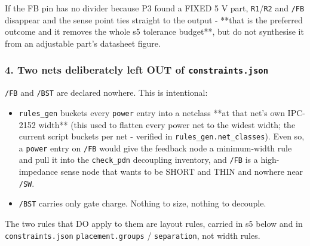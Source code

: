 \documentclass[11pt,a4paper]{article}
\begin{document}
If the FB pin has no divider because P3 found a FIXED 5 V part, \texttt{R1}/\texttt{R2} and \texttt{/FB} disappear and the sense point ties straight to the output - {*}{*}that is the preferred outcome and it removes the whole s5 tolerance budget{*}{*}, but do not synthesise it from an adjustable part's datasheet figure.

\subsubsection*{4. Two nets deliberately left OUT of \texttt{constraints.json}}
\texttt{/FB} and \texttt{/BST} are declared nowhere. This is intentional:

\begin{itemize}
\item \texttt{rules\_gen} buckets every \texttt{power} entry into a netclass {*}{*}at that net's own
IPC-2152 width{*}{*} (this used to flatten every power net to the widest width;
the current script buckets per net - verified in \texttt{rules\_gen.net\_classes}).
Even so, a \texttt{power} entry on \texttt{/FB} would give the feedback node a
minimum-width rule and pull it into the \texttt{check\_pdn} decoupling inventory,
and \texttt{/FB} is a high-impedance sense node that wants to be SHORT and THIN
and nowhere near \texttt{/SW}.
\item \texttt{/BST} carries only gate charge. Nothing to size, nothing to decouple.
\end{itemize}
The two rules that DO apply to them are layout rules, carried in s5 below and in \texttt{constraints.json} \texttt{placement.groups} / \texttt{separation}, not width rules.
\end{document}
